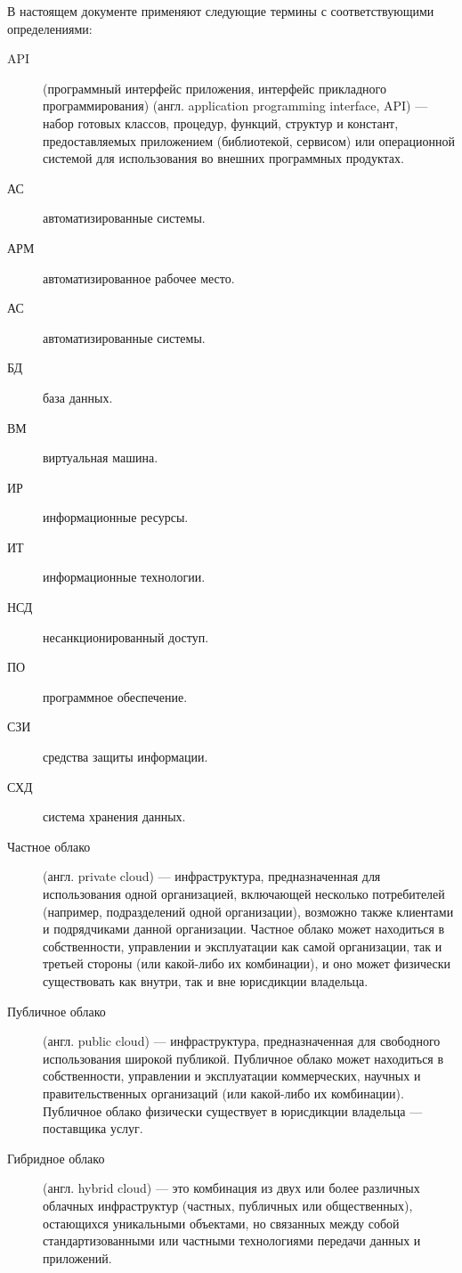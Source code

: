 \Abbreviations

В настоящем документе применяют следующие термины с соответствующими определениями:
\begin{description}
\item [API] (программный интерфейс приложения, интерфейс прикладного программирования) (англ. application programming interface, API) — набор готовых классов, процедур, функций, структур и констант, предоставляемых приложением (библиотекой, сервисом) или операционной системой для использования во внешних программных продуктах.
\item [АС] автоматизированные системы.
\item [АРМ] автоматизированное рабочее место.
\item [АС] автоматизированные системы.
\item [БД] база данных.
\item [ВМ] виртуальная машина.
\item [ИР] информационные ресурсы.
\item [ИТ] информационные технологии.
\item [НСД] несанкционированный доступ.
\item [ПО] программное обеспечение.
\item [СЗИ] средства защиты информации.
\item [СХД] система хранения данных.

\item [Частное облако] (англ. private cloud) — инфраструктура, предназначенная для использования одной организацией, включающей несколько потребителей (например, подразделений одной организации), возможно также клиентами и подрядчиками данной организации. Частное облако может находиться в собственности, управлении и эксплуатации как самой организации, так и третьей стороны (или какой-либо их комбинации), и оно может физически существовать как внутри, так и вне юрисдикции владельца.

\item [Публичное облако] (англ. public cloud) — инфраструктура, предназначенная для свободного использования широкой публикой. Публичное облако может находиться в собственности, управлении и эксплуатации коммерческих, научных и правительственных организаций (или какой-либо их комбинации). Публичное облако физически существует в юрисдикции владельца — поставщика услуг.

\item [Гибридное облако] (англ. hybrid cloud) — это комбинация из двух или более различных облачных инфраструктур (частных, публичных или общественных), остающихся уникальными объектами, но связанных между собой стандартизованными или частными технологиями передачи данных и приложений.


\end{description}
